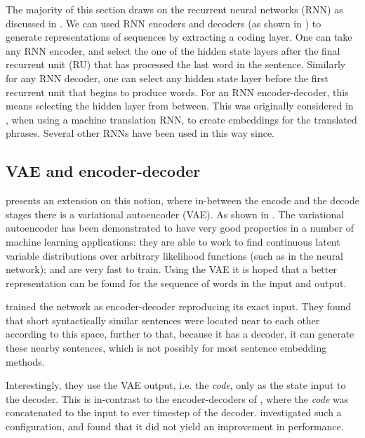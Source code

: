 \documentclass[12pt,parskip]{komatufte}
\begin{document}
The majority of this section draws on the recurrent neural networks (RNN) as discussed in .
We can used RNN encoders and decoders (as shown in ) to generate representations of sequences by extracting a coding layer.
One can take any RNN encoder,
and select the one of the hidden state layers after the final recurrent unit (RU) that has processed the last word in the sentence.
Similarly for any RNN decoder, one can select any hidden state layer before the first recurrent unit that begins to produce words.
For an RNN encoder-decoder, this means selecting the hidden layer from between.
This was originally considered in , when using a machine translation RNN, to create embeddings for the translated phrases.
Several other RNNs have been used in this way since.

\subsection{VAE and encoder-decoder}\label{sec:vae-and-encoder-decoder}
 presents an extension on this notion,
where in-between the encode and the decode stages there is a variational autoencoder (VAE).
As shown in .
The variational autoencoder  has been demonstrated to have very good properties in a number of machine learning applications: they are able to work to find continuous latent variable distributions over arbitrary likelihood functions (such as in the neural network); and are very fast to train.
Using the VAE it is hoped that a better representation can be found for the sequence of words in the input and output.


\textcite{Bowman2015SmoothGeneration} trained the network as encoder-decoder reproducing its exact input.
They found that short syntactically similar sentences were located near to each other according to this space,
further to that, because it has a decoder, it can generate these nearby sentences,
which is not possibly for most sentence embedding methods.

Interestingly, they use the VAE output, i.e. the \emph{code}, only as the state input to the decoder.
This is in-contrast to the encoder-decoders of \textcite{cho-EtAl:2014:EMNLP2014},
where the \emph{code} was concatenated to the input to ever timestep of the decoder.
\textcite{Bowman2015SmoothGeneration} investigated such a configuration,
and found that it did not yield an improvement in performance.
\end{document}
